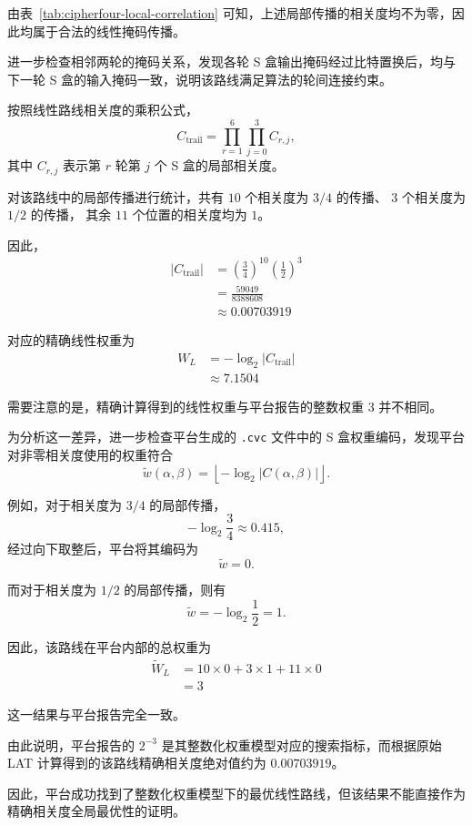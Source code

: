 由表~\ref{tab:cipherfour-local-correlation} 可知，上述局部传播的相关度均不为零，因此均属于合法的线性掩码传播。

进一步检查相邻两轮的掩码关系，发现各轮 S 盒输出掩码经过比特置换后，均与下一轮 S 盒的输入掩码一致，说明该路线满足算法的轮间连接约束。

按照线性路线相关度的乘积公式，
\[
C_{\mathrm{trail}}
=
\prod_{r=1}^{6}\prod_{j=0}^{3}C_{r,j},
\]
其中 $C_{r,j}$ 表示第 $r$ 轮第 $j$ 个 S 盒的局部相关度。

对该路线中的局部传播进行统计，共有
$10$ 个相关度为 $3/4$ 的传播、
$3$ 个相关度为 $1/2$ 的传播，
其余 $11$ 个位置的相关度均为 $1$。

因此，
\[
\begin{aligned}
|C_{\mathrm{trail}}|
&=\left(\frac34\right)^{10}
  \left(\frac12\right)^3\\
&=\frac{59049}{8388608}\\
&\approx 0.00703919
\end{aligned}
\]

对应的精确线性权重为
\[
\begin{aligned}
W_L
&=-\log_2|C_{\mathrm{trail}}|\\
&\approx 7.1504
\end{aligned}
\]

需要注意的是，精确计算得到的线性权重与平台报告的整数权重 $3$ 并不相同。

为分析这一差异，进一步检查平台生成的 \texttt{.cvc} 文件中的 S 盒权重编码，发现平台对非零相关度使用的权重符合
\[
\widetilde{w}(\alpha,\beta)
=
\left\lfloor
-\log_2|C(\alpha,\beta)|
\right\rfloor.
\]

例如，对于相关度为 $3/4$ 的局部传播，
\[
-\log_2\frac34\approx0.415,
\]
经过向下取整后，平台将其编码为
\[
\widetilde{w}=0.
\]

而对于相关度为 $1/2$ 的局部传播，则有
\[
\widetilde{w}
=-\log_2\frac12
=1.
\]

因此，该路线在平台内部的总权重为
\[
\begin{aligned}
\widetilde{W}_L
&=10\times0+3\times1+11\times0\\
&=3
\end{aligned}
\]

这一结果与平台报告完全一致。

由此说明，平台报告的 $2^{-3}$ 是其整数化权重模型对应的搜索指标，而根据原始 LAT 计算得到的该路线精确相关度绝对值约为 $0.00703919$。

因此，平台成功找到了整数化权重模型下的最优线性路线，但该结果不能直接作为精确相关度全局最优性的证明。

